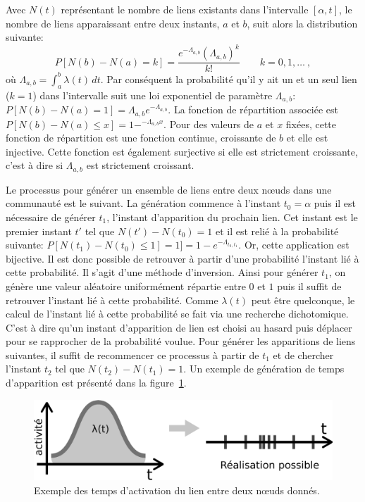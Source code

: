 \bigskip

Avec $N(t)$ représentant le nombre de liens existants dans l'intervalle $[\alpha,t]$, le nombre de liens apparaissant entre deux instants, $a$ et $b$, suit alors la distribution suivante:
\begin{equation}
P [N(b) - N(a) = k] = \frac{e^{-\Lambda_{a,b}} (\Lambda_{a,b})^k}{k!} \qquad k= 0,1,\ldots \ ,
\end{equation}
où $\Lambda_{a,b}=\int_a^b \lambda(t)\,dt$.
Par conséquent la probabilité qu'il y ait un et un seul lien ($k=1$) dans l'intervalle suit une loi exponentiel de paramètre $\Lambda_{a,b}$: $P [N(b) - N(a) = 1]=\Lambda_{a,b}e^{-\Lambda_{a,b}}$.
La fonction de répartition associée est $P [N(b) - N(a) \leq x]= 1 - ^{-\Lambda_{a,b}x}$.
Pour des valeurs de $a$ et $x$ fixées, cette fonction de répartition est une fonction continue, croissante de $b$ et elle est injective.
Cette fonction est également surjective si elle est strictement croissante, c'est à dire si $\Lambda_{a,b}$ est strictement croissant.

Le processus pour générer un ensemble de liens entre deux n\oe uds dans une communauté est le suivant.
La génération commence à l'instant $t_0=\alpha$ puis il est nécessaire de générer $t_1$, l'instant d'apparition du prochain lien.
Cet instant est le premier instant $t'$ tel que $N(t')- N(t_0)=1$ et il est relié à la probabilité suivante: $P [N(t_1) - N(t_0) \leq 1] = 1]=1-e^{-\Lambda_{t_0,t_1}}$.
Or, cette application est bijective.
Il est donc possible de retrouver à partir d'une probabilité l'instant lié à cette probabilité.
Il s'agit d'une méthode d'inversion.
Ainsi pour générer $t_1$, on génère une valeur aléatoire uniformément répartie entre $0$ et $1$ puis il suffit de retrouver l'instant lié à cette probabilité.
Comme $\lambda(t)$ peut être quelconque, le calcul de l'instant lié à cette probabilité se fait via une recherche dichotomique.
C'est à dire qu'un instant d'apparition de lien est choisi au hasard puis déplacer pour se rapprocher de la probabilité voulue.
Pour générer les apparitions de liens suivantes, il suffit de recommencer ce processus à partir de $t_1$ et de chercher l'instant $t_2$ tel que $N(t_2)- N(t_1)=1$.
Un exemple de génération de temps d'apparition est présenté dans la figure~\ref{fig:qualite_Activation}.


\begin{figure}
\centering
\includegraphics[width=0.6\linewidth]{img/Qualite/Activation}
\caption{Exemple des temps d'activation du lien entre deux n\oe uds donnés.}
\label{fig:qualite_Activation}
\end{figure}


